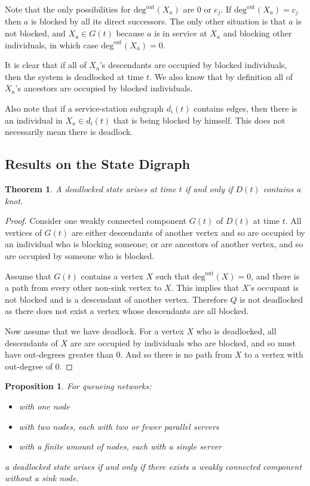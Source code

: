 \documentclass{article}
\newtheorem{theorem}{Theorem}
\newtheorem{proposition}{Proposition}
\begin{document}
Note that the only possibilities for $\text{deg}^{\text{out}}(X_a)$ are 0 or $c_j$.
If $\text{deg}^{\text{out}}(X_a) = c_j$ then $a$ is blocked by all its direct successors.
The only other situation is that $a$ is not blocked, and $X_a \in G(t)$ because $a$ is in service at $X_a$ and blocking other individuals, in which case $\text{deg}^{\text{out}}(X_a) = 0$.

It is clear that if all of $X_a$'s descendants are occupied by blocked individuals, then the system is deadlocked at time $t$.
We also know that by definition all of $X_a$'s ancestors are occupied by blocked individuals.

Also note that if a service-station subgraph $d_i(t)$ contains edges, then there is an individual in $X_a \in d_i(t)$ that is being blocked by himself.
This does not necessarily mean there is deadlock.


\subsection{Results on the State Digraph}

\begin{theorem}
A deadlocked state arises at time $t$ if and only if $D(t)$ contains a knot.
\end{theorem}

\begin{proof}
Consider one weakly connected component $G(t)$ of $D(t)$ at time $t$.
All vertices of $G(t)$ are either descendants of another vertex and so are occupied by an individual who is blocking someone; or are ancestors of another vertex, and so are occupied by someone who is blocked.

Assume that $G(t)$ contains a vertex $X$ such that $\text{deg}^{\text{out}}(X) = 0$, and there is a path from every other non-sink vertex to $X$.
This implies that $X$'s occupant is not blocked and is a descendant of another vertex.
Therefore $Q$ is not deadlocked as there does not exist a vertex whose descendants are all blocked.

Now assume that we have deadlock.
For a vertex $X$ who is deadlocked, all descendants of $X$ are are occupied by individuals who are blocked, and so must have out-degrees greater than 0.
And so there is no path from $X$ to a vertex with out-degree of 0.

\end{proof}


\begin{proposition}
For queueing networks:
\begin{itemize}
  \item with one node
  \item with two nodes, each with two or fewer parallel servers
  \item with a finite amount of nodes, each with a single server
\end{itemize}
a deadlocked state arises if and only if there exists a weakly connected component without a sink node.
\end{proposition}
\end{document}
